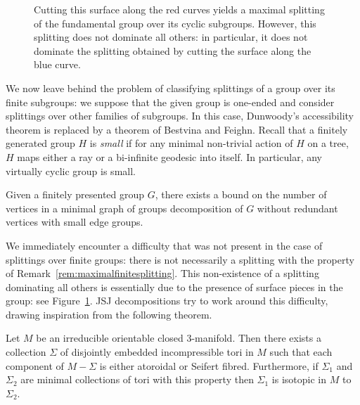 \begin{figure}
  \begin{center}
    
  \end{center}
  \caption{
    Cutting this surface along the red curves yields a maximal splitting of the fundamental group over its cyclic subgroups.
    However, this splitting does not dominate all others: in particular, it does not dominate the splitting obtained by cutting the surface along the blue curve.
  }
  \label{figure:surface_splitting}
\end{figure}

We now leave behind the problem of classifying splittings of a group over its finite subgroups: we suppose that the given group is one-ended and consider splittings over other families of subgroups.
In this case, Dunwoody's accessibility theorem is replaced by a theorem of Bestvina and Feighn.
Recall that a finitely generated group $H$ is \emph{small} if for any minimal non-trivial action of $H$ on a tree, $H$ maps either a ray or a bi-infinite geodesic into itself.
In particular, any virtually cyclic group is small.

\begin{theorem}\cite{bestvinafeighn91}\label{theorem:bestvina_feighn_accessibility}
  Given a finitely presented group $G$, there exists a bound on the number of vertices in a minimal graph of groups decomposition of $G$ without redundant vertices with small edge groups.
\end{theorem}

We immediately encounter a difficulty that was not present in the case of splittings over finite groups: there is not necessarily a splitting with the property of Remark~\ref{rem:maximalfinitesplitting}.
This non-existence of a splitting dominating all others is essentially due to the presence of surface pieces in the group: see Figure~\ref{figure:surface_splitting}.
JSJ decompositions try to work around this difficulty, drawing inspiration from the following theorem.

\begin{theorem}\cite{jacoshalen79,johannson79}
  Let $M$ be an irreducible orientable closed 3-manifold.
  Then there exists a collection\/ $\Sigma$ of disjointly embedded incompressible tori in $M$ such that each component of\/ $M - \Sigma$ is either atoroidal or Seifert fibred.
  Furthermore, if\/ $\Sigma_1$ and\/ $\Sigma_2$ are minimal collections of tori with this property then $\Sigma_1$ is isotopic in $M$ to $\Sigma_2$.
\end{theorem}

